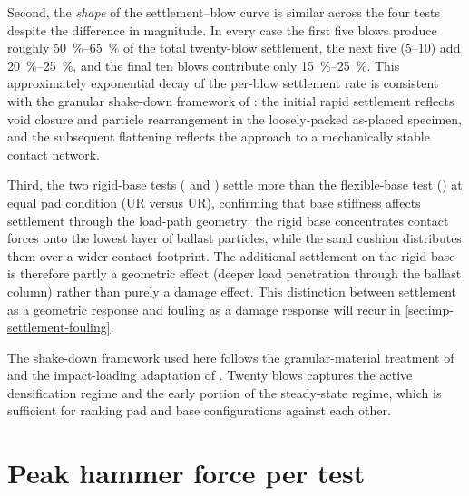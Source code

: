 Second, the \emph{shape} of the settlement--blow curve is similar across
the four tests despite the difference in magnitude. In every case the
first five blows produce roughly \SIrange{50}{65}{\percent} of the total
twenty-blow settlement, the next five (\numrange{5}{10}) add
\SIrange{20}{25}{\percent}, and the final ten blows contribute only
\SIrange{15}{25}{\percent}. This approximately exponential decay of the
per-blow settlement rate is consistent with the granular shake-down
framework of \citet{Werkmeister2001}: the initial rapid settlement
reflects void closure and particle rearrangement in the loosely-packed
as-placed specimen, and the subsequent flattening reflects the approach
to a mechanically stable contact network.

Third, the two rigid-base tests ( and )
settle more than the flexible-base test () at equal pad
condition (\gls{UR} versus \gls{UR}), confirming that base stiffness
affects settlement through the load-path geometry: the rigid base
concentrates contact forces onto the lowest layer of ballast particles,
while the sand cushion distributes them over a wider contact footprint.
The additional settlement on the rigid base is therefore partly a
geometric effect (deeper load penetration through the ballast column)
rather than purely a damage effect. This distinction between settlement
as a geometric response and fouling as a damage response will recur in
\cref{sec:imp-settlement-fouling}.

\begin{thesisnote}[title=Shake-down framework]
The shake-down framework used here follows the granular-material
treatment of \citet{Werkmeister2001} and the impact-loading adaptation of
\citet{Nimbalkar2012}. Twenty blows captures the active densification
regime and the early portion of the steady-state regime, which is
sufficient for ranking pad and base configurations against each other.
\end{thesisnote}

\section{Peak hammer force per test}
\label{sec:imp-peak-force}

